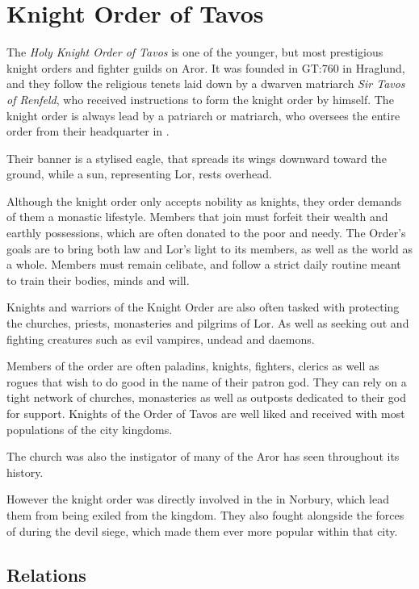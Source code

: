 \section{Knight Order of Tavos}
\label{sec:Knight Order of Tavos}

The \emph{Holy Knight Order of Tavos} is one of the younger, but most
prestigious knight orders and fighter guilds on Aror. It was founded in GT:760
in Hraglund, and they follow the religious tenets laid down by a dwarven
matriarch \emph{Sir Tavos of Renfeld}, who received instructions to form the
knight order by  himself. The knight order is always lead by
a patriarch or matriarch, who oversees the entire order from their headquarter
in .

Their banner is a stylised eagle, that spreads its wings downward toward the
ground, while a sun, representing Lor, rests overhead.

Although the knight order only accepts nobility as knights, they order demands
of them a monastic lifestyle. Members that join must forfeit their wealth and
earthly possessions, which are often donated to the poor and needy. The
Order's goals are to bring both law and Lor's light to its members, as well as
the world as a whole. Members must remain celibate, and follow a strict daily
routine meant to train their bodies, minds and will.

Knights and warriors of the Knight Order are also often tasked with protecting
the churches, priests, monasteries and pilgrims of Lor. As well as seeking out
and fighting creatures such as evil vampires, undead and daemons.

Members of the order are often paladins, knights, fighters, clerics as well as
rogues that wish to do good in the name of their patron god.  They can rely on
a tight network of churches, monasteries as well as outposts dedicated to
their god for support. Knights of the Order of Tavos are well liked and
received with most populations of the city kingdoms.

The church was also the instigator of many of the  Aror
has seen throughout its history.

However the knight order was directly involved in the  in Norbury, which lead them from being exiled from the
kingdom. They also fought alongside the forces of  during
the devil siege, which made them ever more popular within that city.

\subsection{Relations}


